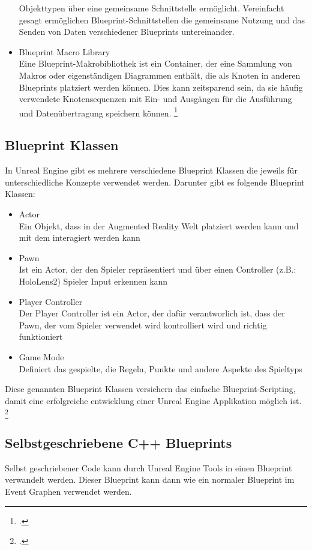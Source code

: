 \begin{itemize}
    Objekttypen über eine gemeinsame Schnittstelle ermöglicht. Vereinfacht gesagt ermöglichen Blueprint-Schnittstellen
    die gemeinsame Nutzung und das Senden von Daten verschiedener Blueprints untereinander.
    \item Blueprint Macro Library\\
    Eine Blueprint-Makrobibliothek ist ein Container, der eine Sammlung von Makros oder eigenständigen Diagrammen enthält,
    die als Knoten in anderen Blueprints platziert werden können. Dies kann zeitsparend sein, da sie häufig verwendete
    Knotensequenzen mit Ein- und Ausgängen für die Ausführung und Datenübertragung speichern können. \footcite{https://docs.unrealengine.com/4.27/en-US/ProgrammingAndScripting/Blueprints/UserGuide/Types/}
\end{itemize}

\subsection{Blueprint Klassen}
In Unreal Engine gibt es mehrere verschiedene Blueprint Klassen die jeweils für unterschiedliche
Konzepte verwendet werden. Darunter gibt es folgende Blueprint Klassen:
\begin{itemize}
    \item Actor \\
    Ein Objekt, dass in der Augmented Reality Welt platziert werden kann und mit
    dem interagiert werden kann
    \item Pawn \\
    Ist ein Actor, der den Spieler repräsentiert und über einen Controller (z.B.: HoloLens2)
    Spieler Input erkennen kann
    \item Player Controller \\
    Der Player Controller ist ein Actor, der dafür verantworlich ist, dass der
    Pawn, der vom Spieler verwendet wird kontrolliert wird und richtig funktioniert
    \item Game Mode \\
    Definiert das gespielte, die Regeln, Punkte und andere Aspekte des Spieltyps
\end{itemize}
Diese genannten Blueprint Klassen versichern das einfache Blueprint-Scripting, damit eine erfolgreiche
entwicklung einer Unreal Engine Applikation möglich ist. \footcite{https://docs.unrealengine.com/4.27/en-US/ProgrammingAndScripting/Blueprints/UserGuide/Types/}

\subsection{Selbstgeschriebene C++ Blueprints}
Selbst geschriebener Code kann durch Unreal Engine Tools in einen Blueprint verwandelt werden.
Dieser Blueprint kann dann wie ein normaler Blueprint im Event Graphen verwendet werden.


